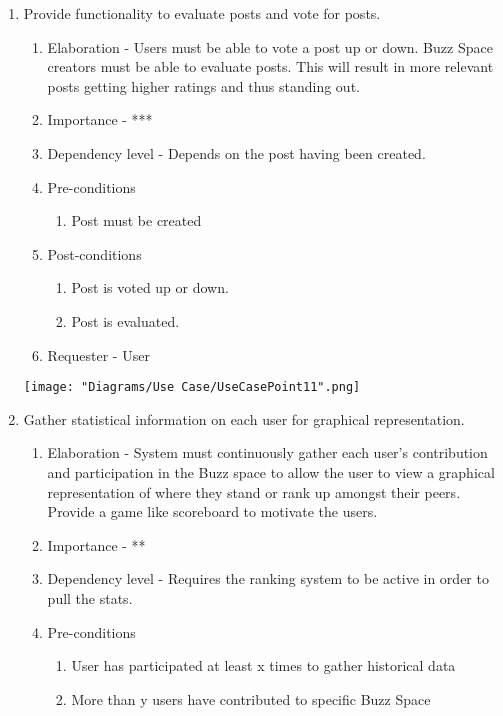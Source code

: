 \documentclass[12pt]{article}
\begin{document}
\begin{enumerate}
\begin{enumerate}
  \end{enumerate}
\clearpage %
   \item  Provide functionality to evaluate posts and vote for posts. %
  \begin{enumerate}
    \item Elaboration - Users must be able to vote a post up or down. Buzz Space creators must be able to evaluate posts. This will result in more relevant posts getting higher ratings and thus standing out.
    \item Importance - ***
    \item Dependency level - Depends on the post having been created.
    \item Pre-conditions
    \begin{enumerate}
    	\item Post must be created
    \end{enumerate}
        \item Post-conditions
    \begin{enumerate}
    	\item Post is voted up or down.
    	\item Post is evaluated.
    \end{enumerate}
    \item Requester - User
  \end{enumerate}
  	\texttt{[image: "Diagrams/Use Case/UseCasePoint11".png]}
\clearpage %
   \item Gather statistical information on each user for graphical representation. %
  \begin{enumerate}
    \item Elaboration - System must continuously gather each user’s contribution and participation in the Buzz space to allow the user to view a graphical representation of where they stand or rank up amongst their peers. Provide a game like scoreboard to motivate the users.
    \item Importance - **
    \item Dependency level - Requires the ranking system to be active in order to pull the stats. 
    \item Pre-conditions
    \begin{enumerate}
    	\item User has participated at least x times to gather historical data
    	\item More than y users have contributed to specific Buzz Space

\end{enumerate}
\end{enumerate}
\end{enumerate}
\end{document}
